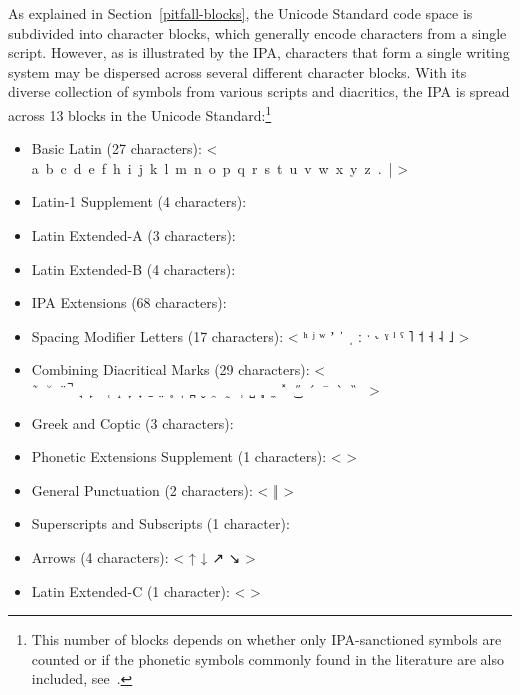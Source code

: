 As explained in Section~\ref{pitfall-blocks}, the Unicode Standard code space is
subdivided into character blocks, which generally encode characters from a
single script. However, as is illustrated by the IPA, characters that form a
single writing system may be dispersed across several different character
blocks. With its diverse collection of symbols from various scripts and
diacritics, the IPA is spread across 13 blocks in the Unicode
Standard:\footnote{This number of blocks depends on whether only IPA-sanctioned
symbols are counted or if the phonetic symbols commonly found in the literature
are also included, see~\cite[Appendix~C]{Moran2012}.}

\begin{itemize}
	\item Basic Latin (27 characters): \newline < a~b~c~d~e~f~h~i~j~k~l~m~n~o~p~q~r~s~t~u~v~w~x~y~z~.~| >
	\item Latin-1 Supplement (4 characters): \newline < æ ç ð ø >
	\item Latin Extended-A (3 characters): \newline < ħ ŋ œ >
	\item Latin Extended-B (4 characters): \newline < ǀ ǁ ǂ ǃ >
	\item IPA Extensions (68 characters): \newline < ɐ ɑ ɒ ɓ ɔ ɕ ɖ ɗ ɘ ə ɛ ɜ ɞ ɟ ɠ ɡ ɢ ɣ ɤ ɥ ɦ ɧ ɨ ɪ ɫ ɬ ɭ ɮ ɯ ɰ ɱ ɲ ɳ ɴ ɵ ɶ ɸ ɹ ɺ ɻ ɽ ɾ ʀ ʁ ʂ ʃ ʄ ʈ ʉ ʊ ʋ ʌ ʍ ʎ ʏ ʐ ʑ ʒ ʔ ʕ ʘ ʙ ʛ ʜ ʝ ʟ ʡ ʢ > 
	\item Spacing Modifier Letters (17 characters): \newline < ʰ ʲ ʷ ʼ ˈ ˌ ː ˑ ˞ ˠ ˡ ˤ ˥ ˦ ˧ ˨ ˩ >
	\item Combining Diacritical Marks (29 characters): \newline < {\large \  ̃\ \ ̆\ \ ̈\ ̚\ \ ̘\ \ ̙\ \ \ ̜\ \ ̝\ \ ̞\ \ ̟\ \ ̠\ \ ̤\ \ ̥\ \ ̩\ \ ̪\ \ ̬\ \ ̯\ \ ̰\ \ ̹\ \ ̺\ \ ̻\ \ ̼\ \ ̽\ \ ͜\  ̋\ \ ́\ \ ̄\ \ ̀\ \ ̏\ } >
	\item Greek and Coptic (3 characters): \newline < β θ χ >
	\item Phonetic Extensions Supplement (1 characters): \newline <  >
    \item General Punctuation (2 characters): \newline < ‖  >
	\item Superscripts and Subscripts (1 character): \newline < ⁿ > 
	\item Arrows (4 characters): \newline < ↑ ↓ ↗ ↘ >
	\item Latin Extended-C (1 character): \newline <  >
\end{itemize}

